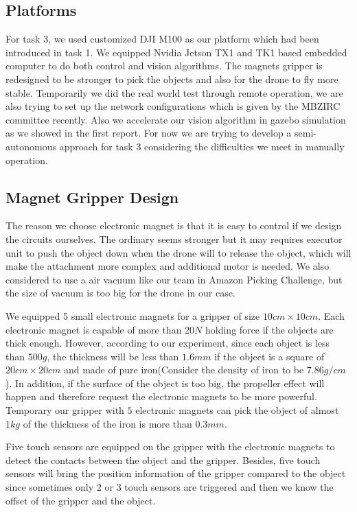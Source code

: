 \documentclass{standalone}
\begin{document}
\subsection{Platforms}
For task 3, we used customized DJI M100 as our platform which had been introduced in task 1. We equipped Nvidia Jetson TX1 and TK1 based embedded computer to do both control and vision algorithms. The magnets gripper is redesigned to be stronger to pick the objects and also for the drone to fly more stable. Temporarily we did the real world test through remote operation, we are also trying to set up the network configurations which is given by the MBZIRC committee recently. Also we accelerate our vision algorithm in gazebo simulation as we showed in the first report. For now we are trying to develop a semi-autonomous approach for task 3 considering the difficulties we meet in manually operation.

\subsection{Magnet Gripper Design}
The reason we choose electronic magnet is that it is easy to control if we design the circuits ourselves. The ordinary seems stronger but it may requires executor unit to push the object down when the drone will to release the object, which will make the attachment more complex and additional motor is needed. We also considered to use a air vacuum like our team in Amazon Picking Challenge, but the size of vacuum is too big for the drone in our case. 

We equipped 5 small electronic magnets for a gripper of size $10cm \times 10cm$. Each electronic magnet is capable of more than $20N$ holding force if the objects are thick enough. However, according to our experiment, since each object is less than $500g$, the thickness will be less than $1.6mm$ if the object is a square of $20cm \times 20cm$ and made of pure iron(Consider the density of iron to be $7.86g/cm$). In addition, if the surface of the object is too big, the propeller effect will happen and therefore request the electronic magnets to be more powerful. Temporary our gripper with $5$ electronic magnets can pick the object of almost $1kg$ of the thickness of the iron is more than $0.3mm$. 

Five touch sensors are equipped on the gripper with the electronic magnets to detect the contacts between the object and the gripper. Besides, five touch sensors will bring the position information of the gripper compared to the object since sometimes only $2$ or $3$ touch sensors are triggered and then we know the offset of the gripper and the object. 
\end{document}
